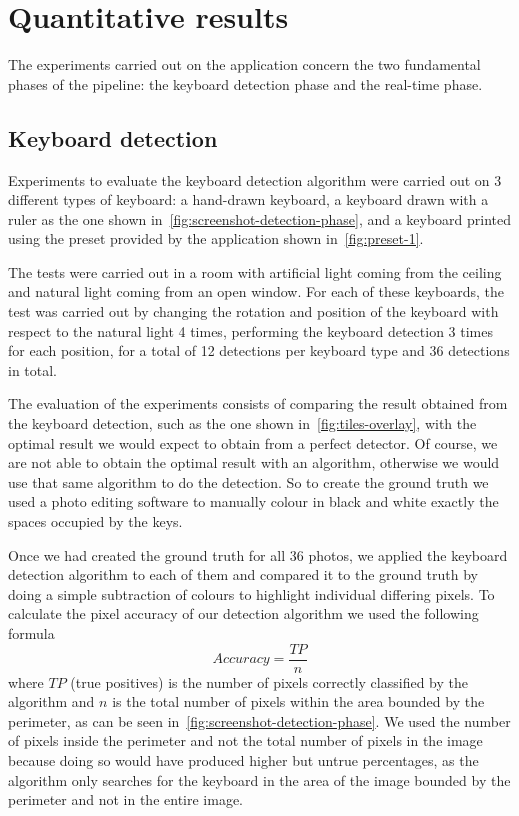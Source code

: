 \section{Quantitative results}\label{sec:quantitative-results}
The experiments carried out on the application concern the two fundamental
phases of the pipeline: the keyboard detection phase and the real-time phase.

\subsection{Keyboard detection}\label{subsec:keyboard-detection}
Experiments to evaluate the keyboard detection algorithm were carried out on 3 different types of keyboard:
a hand-drawn keyboard, a keyboard drawn with a ruler as the one shown in~\autoref{fig:screenshot-detection-phase},
and a keyboard printed using the preset provided by the application shown in~\autoref{fig:preset-1}.

The tests were carried out in a room with artificial light coming from the ceiling
and natural light coming from an open window.
For each of these keyboards, the test was carried out by changing the rotation and position of
the keyboard with respect to the natural light 4 times, performing the keyboard detection 3 times for each position,
for a total of 12 detections per keyboard type and 36 detections in total.

The evaluation of the experiments consists of comparing the result obtained from the keyboard detection, such as the
one shown in~\autoref{fig:tiles-overlay}, with the optimal result we would expect to obtain from a perfect detector.
Of course, we are not able to obtain the optimal result with an algorithm,
otherwise we would use that same algorithm to do the detection.
So to create the ground truth we used a photo editing software to manually colour
in black and white exactly the spaces occupied by the keys.

Once we had created the ground truth for all 36 photos,
we applied the keyboard detection algorithm to each of them and compared it to the ground truth
by doing a simple subtraction of colours to highlight individual differing pixels.
To calculate the pixel accuracy of our detection algorithm we used the following formula
\[
	Accuracy = \frac{TP}{n}
\]
where $TP$ (true positives) is the number of pixels correctly classified by the algorithm and $n$ is the total number
of pixels within the area bounded by the perimeter, as can be seen in~\autoref{fig:screenshot-detection-phase}.
We used the number of pixels inside the perimeter and not the total number of pixels in the image because doing so
would have produced higher but untrue percentages, as the algorithm only searches for the keyboard in
the area of the image bounded by the perimeter and not in the entire image.

